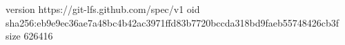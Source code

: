 version https://git-lfs.github.com/spec/v1
oid sha256:eb9e9ec36ae7a48bc4b42ac3971ffd83b7720bccda318bd9faeb55748426cb3f
size 626416
